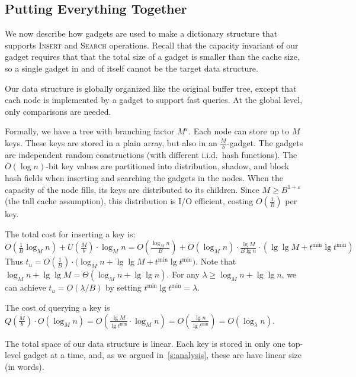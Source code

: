 \documentclass[letterpaper,11pt]{article}
\newcommand{\eps}{\varepsilon}
\newcommand{\proc}[1]{\textnormal{\scshape#1}}
\newcommand{\tmin}{t^{\min}}
\begin{document}
\subsection{Putting Everything Together} \label{s:global}

We now describe how gadgets are used to make a dictionary structure
that supports \proc{Insert} and \proc{Search} operations. Recall that
the capacity invariant of our gadget requires that that the total size
of a gadget is smaller than the cache size, so a single gadget in and
of itself cannot be the target data structure.

Our data structure is globally organized like the original buffer tree,
except that each node is implemented by a gadget to support fast
queries. At the global level, only comparisons are needed.

Formally, we have a tree with branching
factor $M^\eps$. Each node can store up to $M$ keys. These keys are stored in a plain array, but also in an $\frac{M}{b}$-gadget. The
gadgets are independent random constructions (with different
i.i.d.~hash functions). The $O(\log n)$-bit key values are partitioned into distribution, shadow, and block hash fields when inserting and searching the gadgets in the nodes.  When the capacity of the node fills, its keys
are distributed to its children. Since $M\ge B^{1+\eps}$ (the tall
cache assumption), this distribution is I/O efficient, costing
$O(\frac{1}{B})$ per key.

The total cost for inserting a key is:
\[ O(\tfrac{1}{B} \log_M n) + U(\tfrac{M}{b}) \cdot \log_M n
=  O(\tfrac{\log_M n}{B}) + O(\log_M n) \cdot
  \tfrac{\lg M}{B\lg n} \cdot (\lg\lg M + \tmin \lg \tmin)
\]
Thus $t_u = O(\tfrac{1}{B}) \cdot \big( \log_M n + \lg\lg M + \tmin
\lg \tmin \big)$.  Note that $\log_M n + \lg\lg M = \Theta(\log_M n +
\lg\lg n)$.  For any $\lambda\ge \log_M n + \lg\lg n$, we can achieve
$t_u = O(\lambda / B)$ by setting $\tmin \lg \tmin = \lambda$.

The cost of querying a key is $Q(\frac{M}{b}) \cdot O(\log_M n)
= O( \frac{\lg M}{\lg \tmin} \cdot \log_M n) = O(\frac{\lg n}{\lg
  \tmin}) = O(\log_\lambda n)$.

The total space of our data structure is linear. Each key is stored in
only one top-level gadget at a time, and, as we argued
in~\ref{s:analysis}, these are have linear size (in words).

 

\appendix
\end{document}
